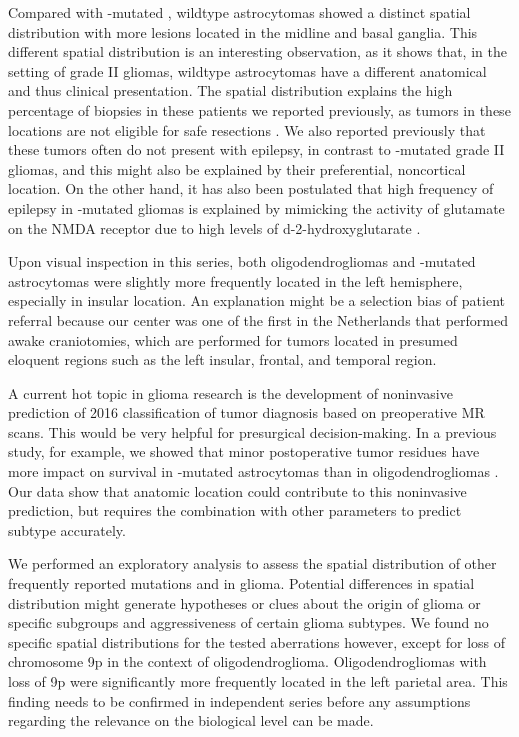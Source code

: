 Compared with -mutated ,  wildtype astrocytomas showed a distinct spatial distribution with more lesions located in the midline and basal ganglia.
This different spatial distribution is an interesting observation, as it shows that, in the setting of grade II gliomas,  wildtype astrocytomas have a different anatomical and thus clinical presentation.
The spatial distribution explains the high percentage of biopsies in these patients we reported previously, as \glspl{tumor} in these locations are not eligible for safe resections \autocite{wijnenga2017impact}.
We also reported previously \autocite{wijnenga2017impact} that these \glspl{tumor} often do not present with epilepsy, in contrast to -mutated grade II gliomas, and this might also be explained by their preferential, noncortical location.
On the other hand, it has also been postulated that high frequency of epilepsy in -mutated gliomas is explained by mimicking the activity of glutamate on the NMDA receptor due to high levels of d-2-hydroxyglutarate \autocite{chen2017mutant}.

Upon visual inspection in this series, both oligodendrogliomas and -mutated astrocytomas were slightly more frequently located in the left hemisphere, especially in insular location.
An explanation might be a selection bias of patient referral because our center was one of the first in the Netherlands that performed awake craniotomies, which are performed for \glspl{tumor} located in presumed eloquent regions such as the left insular, frontal, and temporal region.

A current hot topic in glioma research is the development of noninvasive prediction of  2016 classification of \gls{tumor} diagnosis based on preoperative MR scans.
This would be very helpful for presurgical decision-making.
In a previous study, for example, we showed that minor postoperative \gls{tumor} residues have more impact on survival in -mutated astrocytomas than in oligodendrogliomas \autocite{wijnenga2017impact}.
Our data show that anatomic location could contribute to this noninvasive prediction, but requires the combination with other parameters to predict  subtype accurately.

We performed an exploratory analysis to assess the spatial distribution of other frequently reported mutations and  in glioma.
Potential differences in spatial distribution might generate hypotheses or clues about the origin of glioma or specific subgroups and aggressiveness of certain glioma subtypes.
We found no specific spatial distributions for the tested aberrations however, except for loss of chromosome 9p in the context of oligodendroglioma.
Oligodendrogliomas with loss of 9p were significantly more frequently located in the left parietal area.
This finding needs to be confirmed in independent series before any assumptions regarding the relevance on the biological level can be made.

